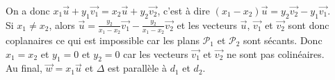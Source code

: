 \documentclass[12px]{article}
\begin{document}
	On a donc $x_1\vec{u} + y_1\vec{v_1} = x_2\vec{u} + y_2\vec{v_2}$, c'est à dire $(x_1 - x_2)\vec{u} = y_2\vec{v_2} - y_1\vec{v_1}$.\\
	
	Si $x_1 \not= x_2$, alors $\vec{u} = \frac{y_2}{x_1 - x_2}\vec{v_1} - \frac{y_2}{x_1 - x_2}\vec{v_2}$ et les vecteurs $\vec{u}$, $\vec{v_1}$ et $\vec{v_2}$ sont donc coplanaires ce qui est impossible car les plans $\mathcal{P}_1$ et $\mathcal{P}_2$ sont sécants.
	Donc $x_1 = x_2$ et $y_1 = 0$ et $y_2 = 0$ car les vecteurs $\vec{v_1}$ et $\vec{v_2}$ ne sont pas colinéaires.\\
	Au final, $\vec{w} = x_1\vec{u}$ et $\Delta$ est parallèle à $d_1$ et $d_2.$
	
	
\end{document}
